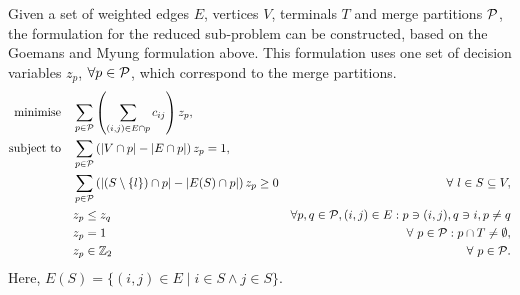 \documentclass[journal]{IEEEtran}
\begin{document}
Given a set of weighted edges \(E\), vertices \(V\), terminals \(T\) and merge partitions \(\S{P}\), the formulation for the reduced sub-problem can be constructed, based on the Goemans and Myung formulation above. This formulation uses one set of decision variables \(z_p\), \(\forall p \in \S{P}\), which correspond to the merge partitions.
{\small
\begin{align}
\Min \quad & \displaystyle\sum_{p \in \S{P}}\left(\displaystyle\sum_{(i,j) \in E \cap p} c_{ij}\right)z_{p},\label{eq:stpg_merge}\\
\ST \quad & \displaystyle\sum_{p \in \S{P}}\left(|V\cap p| - |E\cap p|\right)z_{p} = 1,\nonumber\\
& \displaystyle\sum_{p \in \S{P}}\left(|(S\setminus\{l\}) \cap p| - |E(S)\cap p|\right)z_{p} \geq 0 & \forall\ l \in S \subseteq V,\nonumber\\
& z_p \leq z_q & \forall  p,q\in \S{P},(i,j) \in E : p \ni (i,j),q \ni i,p \neq q \nonumber\\
& z_p = 1 &  \forall\ p \in \S{P} :  p \cap T \neq \emptyset,\nonumber\\
& z_p \in \Bin & \forall\ p \in \S{P}\nonumber.
\end{align}
}
%
Here, \(E(S) = \{(i,j) \in E \mid i \in S \land j \in S\}.\)

% 


\end{document}
